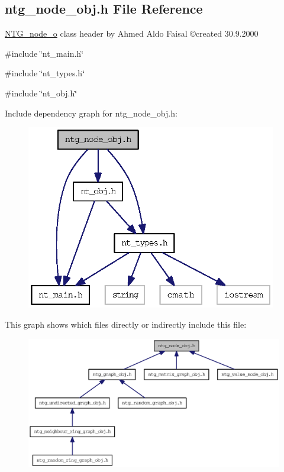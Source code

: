 \subsection{ntg\_\-node\_\-obj.h File Reference}
\label{ntg__node__obj_8h}



\begin{DoxyItemize}
\item \hyperlink{class_n_t_g__node__o}{NTG\_\-node\_\-o} class header by Ahmed Aldo Faisal \copyright created 30.9.2000 
\end{DoxyItemize} 


{\ttfamily \#include \char`\"{}nt\_\-main.h\char`\"{}}\par
{\ttfamily \#include \char`\"{}nt\_\-types.h\char`\"{}}\par
{\ttfamily \#include \char`\"{}nt\_\-obj.h\char`\"{}}\par
Include dependency graph for ntg\_\-node\_\-obj.h:
\nopagebreak
\begin{figure}[H]
\begin{center}
\leavevmode
\includegraphics[width=310pt]{ntg__node__obj_8h__incl}
\end{center}
\end{figure}
This graph shows which files directly or indirectly include this file:
\nopagebreak
\begin{figure}[H]
\begin{center}
\leavevmode
\includegraphics[width=400pt]{ntg__node__obj_8h__dep__incl}
\end{center}
\end{figure}

